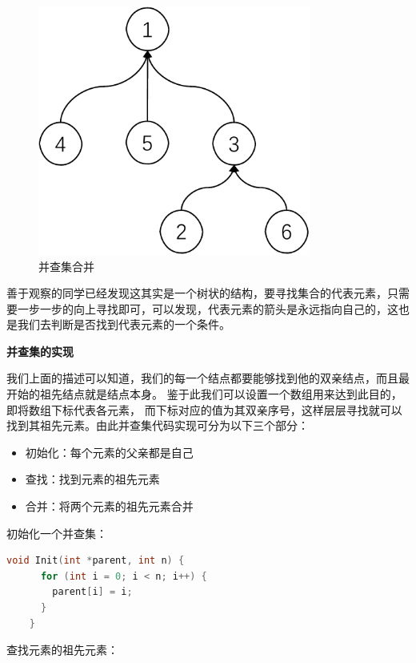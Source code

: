 \documentclass[lang=cn,newtx,10pt,scheme=chinese]{../elegantbook}
\begin{document}
\begin{figure}[h!]
  \centering
  \includegraphics[width=0.8\textwidth]{./figure/pdf/cropped/unionFindExample(e).pdf}
  \caption{并查集合并}
  \label{fig:unionFind5}
\end{figure}

善于观察的同学已经发现这其实是一个树状的结构，要寻找集合的代表元素，只需要一步一步的向上寻找即可，可以发现，代表元素的箭头是永远指向自己的，这也是我们去判断是否找到代表元素的一个条件。

\textbf{并查集的实现}

我们上面的描述可以知道，我们的每一个结点都要能够找到他的双亲结点，而且最开始的祖先结点就是结点本身。
鉴于此我们可以设置一个数组用来达到此目的，即将数组下标代表各元素，
而下标对应的值为其双亲序号，这样层层寻找就可以找到其祖先元素。由此并查集代码实现可分为以下三个部分：

\begin{itemize}
  \item 初始化：每个元素的父亲都是自己
  \item 查找：找到元素的祖先元素
  \item 合并：将两个元素的祖先元素合并
  \end{itemize}

  初始化一个并查集：

  \begin{lstlisting}[language=C++, caption={并查集初始化}]
    void Init(int *parent, int n) {
      for (int i = 0; i < n; i++) {
        parent[i] = i;
      }
    }
  \end{lstlisting}

  查找元素的祖先元素：
\end{document}

